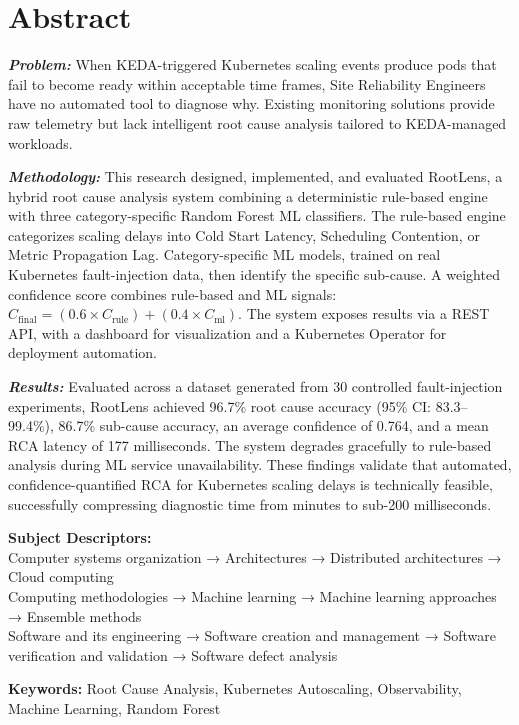 \chapter*{Abstract}
\setlength{\parindent}{0pt}

\textit{\textbf{Problem:}} When KEDA-triggered Kubernetes scaling events produce pods that fail to become ready within acceptable time frames, Site Reliability Engineers have no automated tool to diagnose why. Existing monitoring solutions provide raw telemetry but lack intelligent root cause analysis tailored to KEDA-managed workloads.

\vspace{1em}

\textit{\textbf{Methodology:}} This research designed, implemented, and evaluated RootLens, a hybrid root cause analysis system combining a deterministic rule-based engine with three category-specific Random Forest ML classifiers. The rule-based engine categorizes scaling delays into Cold Start Latency, Scheduling Contention, or Metric Propagation Lag. Category-specific ML models, trained on real Kubernetes fault-injection data, then identify the specific sub-cause. A weighted confidence score combines rule-based and ML signals: 
$C_{\text{final}} = (0.6 \times C_{\text{rule}}) + (0.4 \times C_{\text{ml}})$. 
The system exposes results via a REST API, with a dashboard for visualization and a Kubernetes Operator for deployment automation.

\vspace{1em}

\textit{\textbf{Results:}} Evaluated across a dataset generated from 30 controlled fault-injection experiments, RootLens achieved 96.7\% root cause accuracy (95\% CI: 83.3--99.4\%), 86.7\% sub-cause accuracy, an average confidence of 0.764, and a mean RCA latency of 177 milliseconds. The system degrades gracefully to rule-based analysis during ML service unavailability. These findings validate that automated, confidence-quantified RCA for Kubernetes scaling delays is technically feasible, successfully compressing diagnostic time from minutes to sub-200 milliseconds.

\vspace{2em}

\textbf{Subject Descriptors:}\\
Computer systems organization → Architectures → Distributed architectures → Cloud computing\\
Computing methodologies → Machine learning → Machine learning approaches → Ensemble methods\\
Software and its engineering → Software creation and management → Software verification and validation → Software defect analysis

\vspace{2em}

\textbf{Keywords:} Root Cause Analysis, Kubernetes Autoscaling, Observability, Machine Learning, Random Forest